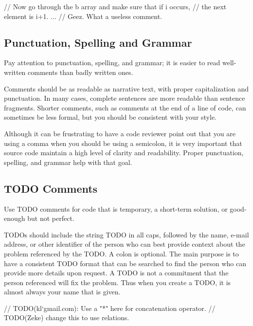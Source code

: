 \begin{DoxyCode}
\textcolor{comment}{// Now go through the b array and make sure that if i occurs,}
\textcolor{comment}{// the next element is i+1.}
...        \textcolor{comment}{// Geez.  What a useless comment.}
\end{DoxyCode}


\subsection*{Punctuation, Spelling and Grammar}

Pay attention to punctuation, spelling, and grammar; it is easier to read well-\/written comments than badly written ones.

Comments should be as readable as narrative text, with proper capitalization and punctuation. In many cases, complete sentences are more readable than sentence fragments. Shorter comments, such as comments at the end of a line of code, can sometimes be less formal, but you should be consistent with your style.

Although it can be frustrating to have a code reviewer point out that you are using a comma when you should be using a semicolon, it is very important that source code maintain a high level of clarity and readability. Proper punctuation, spelling, and grammar help with that goal.

\subsection*{T\+O\+DO Comments}

Use T\+O\+DO comments for code that is temporary, a short-\/term solution, or good-\/enough but not perfect.

T\+O\+D\+Os should include the string T\+O\+DO in all caps, followed by the name, e-\/mail address, or other identifier of the person who can best provide context about the problem referenced by the T\+O\+DO. A colon is optional. The main purpose is to have a consistent T\+O\+DO format that can be searched to find the person who can provide more details upon request. A T\+O\+DO is not a commitment that the person referenced will fix the problem. Thus when you create a T\+O\+DO, it is almost always your name that is given.


\begin{DoxyCode}
\textcolor{comment}{// TODO(kl`gmail.com): Use a "*" here for concatenation operator.}
\textcolor{comment}{// TODO(Zeke) change this to use relations.}
\end{DoxyCode}


